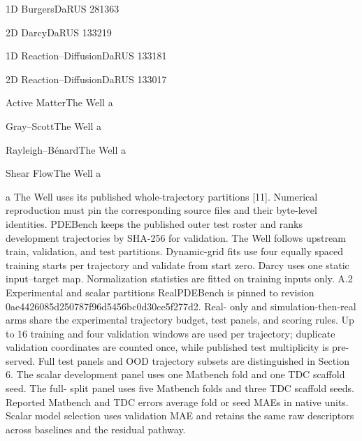\documentclass[11pt]{article}
\begin{document}
\noindent 1D Burgers\quad DaRUS 281363\par


\noindent 2D Darcy\quad DaRUS 133219\par


\noindent 1D Reaction–Diffusion\quad DaRUS 133181\par


\noindent 2D Reaction–Diffusion\quad DaRUS 133017\par


\noindent Active Matter\quad The Well a\par


\noindent Gray–Scott\quad The Well a\par


\noindent Rayleigh–Bénard\quad The Well a\par


\noindent Shear Flow\quad The Well a\par

a
The Well uses its published whole-trajectory partitions [11]. Numerical reproduction must pin
the corresponding source files and their byte-level identities.
PDEBench keeps the published outer test roster and ranks development trajectories by
SHA-256 for validation. The Well follows upstream train, validation, and test partitions.
Dynamic-grid fits use four equally spaced training starts per trajectory and validate from
start zero. Darcy uses one static input–target map. Normalization statistics are fitted on
training inputs only.
A.2 Experimental and scalar partitions
RealPDEBench is pinned to revision 0ae4426085d250787f96d5456bc0d30ce5f277d2. Real-
only and simulation-then-real arms share the experimental trajectory budget, test panels,
and scoring rules. Up to 16 training and four validation windows are used per trajectory;
duplicate validation coordinates are counted once, while published test multiplicity is pre-
served. Full test panels and OOD trajectory subsets are distinguished in Section 6.
The scalar development panel uses one Matbench fold and one TDC scaffold seed. The full-
split panel uses five Matbench folds and three TDC scaffold seeds. Reported Matbench and
TDC errors average fold or seed MAEs in native units. Scalar model selection uses validation
MAE and retains the same raw descriptors across baselines and the residual pathway.
\end{document}
